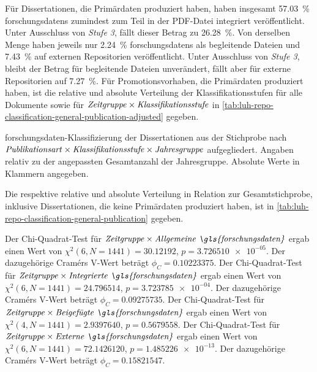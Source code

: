 Für Dissertationen, die Primärdaten produziert haben, haben insgesamt \SI{57,03}{\percent} \glspl{forschungsdaten} zumindest zum Teil in der PDF-Datei integriert veröffentlicht.
Unter Ausschluss von \textit{Stufe 3}, fällt dieser Betrag zu \SI{26,28}{\percent}.
Von derselben Menge haben jeweils nur \SI{2,24}{\percent} \glspl{forschungsdaten} als begleitende Dateien und \SI{7,43}{\percent} auf externen Repositorien veröffentlicht.
Unter Ausschluss von \textit{Stufe 3}, bleibt der Betrag für begleitende Dateien unverändert, fällt aber für externe Repositorien auf \SI{7,27}{\percent}.
Für Promotionsvorhaben, die Primärdaten produziert haben, ist die relative und absolute Verteilung der Klassifikationsstufen für alle Dokumente sowie für $\text{\textit{Zeitgruppe}}\times\text{\textit{Klassifikationsstufe}}$ in \cref{tab:luh-repo-classification-general-publication-adjusted} gegeben.
\begin{table}[!htbp]
	\caption{\gls{forschungsdaten}-Klassifizierung der Dissertationen aus der Stichprobe nach $\text{\textit{Publikationsart}}\times\text{\textit{Klassifikationsstufe}}\times\text{\textit{Jahresgruppe}}$ aufgegliedert.
    Angaben relativ zu der angepassten Gesamtanzahl der Jahresgruppe.
    Absolute Werte in Klammern angegeben.}
    
    \label{tab:luh-repo-classification-general-publication-adjusted}
\end{table}
Die respektive relative und absolute Verteilung in Relation zur Gesamtstichprobe, inklusive Dissertationen, die keine Primärdaten produziert haben, ist in \cref{tab:luh-repo-classification-general-publication} gegeben.

Der Chi-Quadrat-Test für $\text{\textit{Zeitgruppe}}\times\text{\textit{Allgemeine \gls{forschungsdaten}}}$ ergab einen Wert von $\chi^2 (\num{6}, N = \num{1441}) = \num[round-mode=places,round-precision=3]{30.12192}$, $p = \num[round-mode=places,round-precision=3]{3.726510e-05}$.
Der dazugehörige Cramérs V-Wert beträgt $\phi_C=\num[round-mode=places,round-precision=3]{0.10223375}$.
Der Chi-Quadrat-Test für $\text{\textit{Zeitgruppe}}\times\text{\textit{Integrierte \gls{forschungsdaten}}}$ ergab einen Wert von $\chi^2 (\num{6}, N = \num{1441}) = \num[round-mode=places,round-precision=3]{24.796514}$, $p = \num[round-mode=places,round-precision=3]{3.723785e-04}$.
Der dazugehörige Cramérs V-Wert beträgt $\phi_C=\num[round-mode=places,round-precision=3]{0.09275735}$.
Der Chi-Quadrat-Test für $\text{\textit{Zeitgruppe}}\times\text{\textit{Beigefügte \gls{forschungsdaten}}}$ ergab einen Wert von $\chi^2 (\num{4}, N = \num{1441}) = \num[round-mode=places,round-precision=3]{2.9397640}$, $p = \num[round-mode=places,round-precision=3]{0.5679558}$.
Der Chi-Quadrat-Test für $\text{\textit{Zeitgruppe}}\times\text{\textit{Externe \gls{forschungsdaten}}}$ ergab einen Wert von $\chi^2 (\num{6}, N = \num{1441}) = \num[round-mode=places,round-precision=3]{72.1426120}$, $p = \num[round-mode=places,round-precision=3]{1.485226e-13}$.
Der dazugehörige Cramérs V-Wert beträgt $\phi_C=\num[round-mode=places,round-precision=3]{0.15821547}$.

